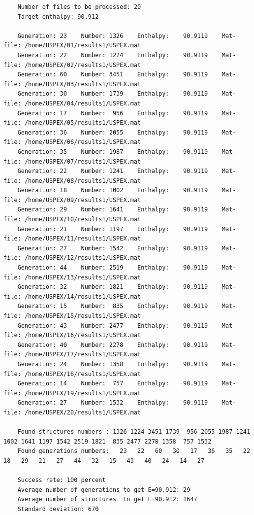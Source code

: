 \documentclass[12pt]{article}
\begin{document}
{\tiny
\begin{verbatim}
	Number of files to be processed: 20
	Target enthalpy: 90.912

	Generation: 23    Number: 1326    Enthalpy:    90.9119    Mat-file: /home/USPEX/01/results1/USPEX.mat
	Generation: 22    Number: 1224    Enthalpy:    90.9119    Mat-file: /home/USPEX/02/results1/USPEX.mat
	Generation: 60    Number: 3451    Enthalpy:    90.9119    Mat-file: /home/USPEX/03/results1/USPEX.mat
	Generation: 30    Number: 1739    Enthalpy:    90.9119    Mat-file: /home/USPEX/04/results1/USPEX.mat
	Generation: 17    Number:  956    Enthalpy:    90.9119    Mat-file: /home/USPEX/05/results1/USPEX.mat
	Generation: 36    Number: 2055    Enthalpy:    90.9119    Mat-file: /home/USPEX/06/results1/USPEX.mat
	Generation: 35    Number: 1987    Enthalpy:    90.9119    Mat-file: /home/USPEX/07/results1/USPEX.mat
	Generation: 22    Number: 1241    Enthalpy:    90.9119    Mat-file: /home/USPEX/08/results1/USPEX.mat
	Generation: 18    Number: 1002    Enthalpy:    90.9119    Mat-file: /home/USPEX/09/results1/USPEX.mat
	Generation: 29    Number: 1641    Enthalpy:    90.9119    Mat-file: /home/USPEX/10/results1/USPEX.mat
	Generation: 21    Number: 1197    Enthalpy:    90.9119    Mat-file: /home/USPEX/11/results1/USPEX.mat
	Generation: 27    Number: 1542    Enthalpy:    90.9119    Mat-file: /home/USPEX/12/results1/USPEX.mat
	Generation: 44    Number: 2519    Enthalpy:    90.9119    Mat-file: /home/USPEX/13/results1/USPEX.mat
	Generation: 32    Number: 1821    Enthalpy:    90.9119    Mat-file: /home/USPEX/14/results1/USPEX.mat
	Generation: 15    Number:  835    Enthalpy:    90.9119    Mat-file: /home/USPEX/15/results1/USPEX.mat
	Generation: 43    Number: 2477    Enthalpy:    90.9119    Mat-file: /home/USPEX/16/results1/USPEX.mat
	Generation: 40    Number: 2278    Enthalpy:    90.9119    Mat-file: /home/USPEX/17/results1/USPEX.mat
	Generation: 24    Number: 1358    Enthalpy:    90.9119    Mat-file: /home/USPEX/18/results1/USPEX.mat
	Generation: 14    Number:  757    Enthalpy:    90.9119    Mat-file: /home/USPEX/19/results1/USPEX.mat
	Generation: 27    Number: 1532    Enthalpy:    90.9119    Mat-file: /home/USPEX/20/results1/USPEX.mat

	Found structures numbers : 1326 1224 3451 1739  956 2055 1987 1241 1002 1641 1197 1542 2519 1821  835 2477 2278 1358  757 1532
	Found generations numbers:   23   22   60   30   17   36   35   22   18   29   21   27   44   32   15   43   40   24   14   27

	Success rate: 100 percent
	Average number of generations to get E=90.912: 29
	Average number of structures  to get E=90.912: 1647
	Standard deviation: 670
\end{verbatim}
}
\end{document}
